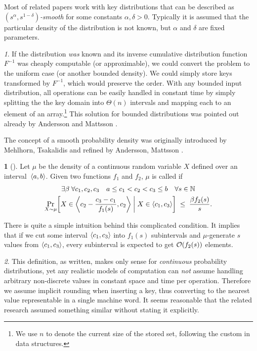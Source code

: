 \documentclass[twoside,english,preprint]{elsarticle}
\theoremstyle{plain}
\theoremstyle{definition}
\newtheorem{defn}[thm]{\protect\definitionname}
\theoremstyle{remark}
\newtheorem*{rem*}{\protect\remarkname}
\theoremstyle{plain}
\theoremstyle{plain}
\providecommand{\definitionname}{Definition}
\providecommand{\remarkname}{Remark}
\begin{document}
Most of related papers work with key distributions that can be described
as \emph{$\left(s^{\alpha},s^{1-\delta}\right)$-smooth} for some
constants $\alpha,\delta>0$. Typically it is assumed that the particular
density of the distribution is not known, but $\alpha$ and $\delta$
are fixed parameters.
\begin{rem*}
If the distribution \emph{was} known and its inverse cumulative distribution
function $F^{-1}$ was cheaply computable (or approximable), we could
convert the problem to the uniform case (or another bounded density).
We could simply store keys transformed by $F^{-1}$, which would preserve
the order. With any bounded input distribution, all operations can
be easily handled in constant time by simply splitting the the key
domain into $\Theta(n)$ intervals and mapping each to an element
of an array.\footnote{We use $n$ to denote the current size of the stored set, following
the custom in data structures.} This solution for bounded distributions was pointed out already by
Andersson and Mattsson \cite[sec. 5.2]{AndersM93}.
\end{rem*}
The concept of a smooth probability density was originally introduced by Mehlhorn, Tsakalidis \cite{MehlT93} and refined by Andersson, Mattsson \cite{AndersM93}.
\begin{defn}[\cite{KMSTTZ06}] \label{def:smooth}
	Let $\mu$ be the density of a continuous random variable $X$ defined over an interval~$\left\langle a,b\right\rangle$. Given two functions $f_1$ and $f_2$, $\mu$ is called  if
	\begin{multline*}
		\exists\beta \; \forall c_1,c_2,c_3 \quad a \le c_1 < c_2 < c_3 \le b \quad \forall s \in \mathbb{N} \\
		\Pr_{X \sim \mu}\!\left[  X \in \left\langle c_2 - \frac{c_3-c_1}{f_1(s)} ,c_2\right\rangle \; \middle| \; X \in \left\langle c_1,c_3\right\rangle  \right]
		\;\le\; \frac{\beta f_2(s)}{s}.
	\end{multline*}
\end{defn}

There is quite a simple intuition behind this complicated condition. It implies that if we cut some interval $\left\langle c_1,c_3\right\rangle$ into $f_1(s)$ subintervals and $\mu$-generate $s$ values from $\left\langle c_1,c_3\right\rangle$, every subinterval is expected to get $\mathcal O(f_2(s))$ elements.

\begin{rem*}
This definition, as written, makes only sense for \emph{continuous} probability
distributions, yet any realistic models of computation can
\emph{not} assume handling arbitrary non-discrete values in constant
space and time per operation. Therefore we assume implicit rounding
when inserting a key, thus converting to the nearest value representable
in a single machine word. It seems reasonable that the related research
assumed something similar without stating it explicitly.
\end{rem*}
\end{document}

